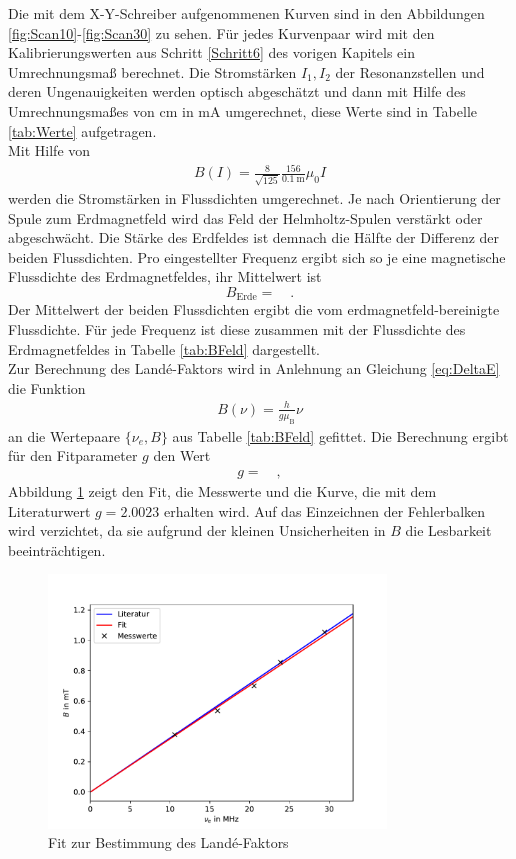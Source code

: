 Die mit dem X-Y-Schreiber aufgenommenen Kurven sind in den Abbildungen \ref{fig:Scan10}-\ref{fig:Scan30} zu sehen. Für jedes Kurvenpaar wird mit den Kalibrierungswerten aus Schritt \ref{Schritt6} des vorigen Kapitels ein Umrechnungsmaß berechnet. Die Stromstärken $I_1,I_2$ der Resonanzstellen und deren Ungenauigkeiten werden optisch abgeschätzt und dann mit Hilfe des Umrechnungsmaßes von \si{\centi\meter} in \si{\milli\ampere} umgerechnet, diese Werte sind in Tabelle \ref{tab:Werte} aufgetragen.
 \\
Mit Hilfe von
\begin{align}
	B(I) = \frac{8}{\sqrt{125}}\frac{156}{\SI{0.1}{\meter}}\mu_0I
\end{align}
werden die Stromstärken in Flussdichten umgerechnet. Je nach Orientierung der Spule zum Erdmagnetfeld wird das Feld der Helmholtz-Spulen verstärkt oder abgeschwächt. Die Stärke des Erdfeldes ist demnach die Hälfte der Differenz der beiden Flussdichten. Pro eingestellter Frequenz ergibt sich so je eine magnetische Flussdichte des Erdmagnetfeldes, ihr Mittelwert ist
\[ B_\text{Erde} =  \quad. \]
Der Mittelwert der beiden Flussdichten ergibt die vom erdmagnetfeld-bereinigte Flussdichte. Für jede Frequenz ist diese zusammen mit der Flussdichte des Erdmagnetfeldes in Tabelle \ref{tab:BFeld} dargestellt.
 \\
\clearpage
Zur Berechnung des Landé-Faktors wird in Anlehnung an Gleichung \eqref{eq:DeltaE} die Funktion
\begin{align*}
	B(\nu) = \frac{h}{g\mu_\text{B}}\nu
\end{align*}
an die Wertepaare $\{\nu_e,B\}$ aus Tabelle \ref{tab:BFeld} gefittet. Die Berechnung ergibt für den Fitparameter $g$ den Wert
\begin{align*}
	g =  \quad,
\end{align*}
Abbildung \ref{fig:fit} zeigt den Fit, die Messwerte und die Kurve, die mit dem Literaturwert $g = 2.0023$ \cite{gFaktor} erhalten wird. Auf das Einzeichnen der Fehlerbalken wird verzichtet, da sie aufgrund der kleinen Unsicherheiten in $B$ die Lesbarkeit beeinträchtigen.
\begin{figure}[h!]
	\centering
	\includegraphics[width=0.8\textwidth]{Fit.pdf}
	\caption{Fit zur Bestimmung des Landé-Faktors}
	\label{fig:fit}
\end{figure}

